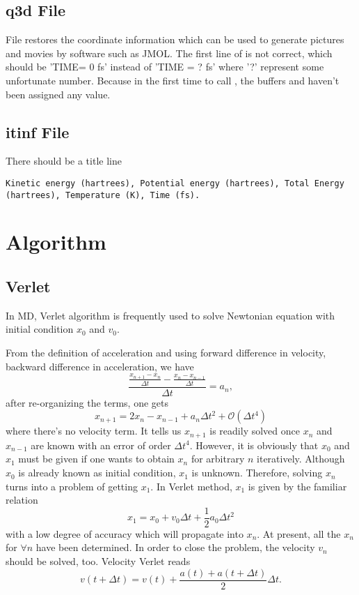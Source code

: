 \documentclass[11pt]{JHEP3}
\begin{document}
\subsection{q3d File}
File  restores the coordinate information which can be
used to generate pictures and movies by software such as JMOL. The
first line of  is not correct, which should be 'TIME= 0
fs' instead of 'TIME = ? fs' where '?' represent some unfortunate
number. Because in the first time to call ,
the buffers  and  haven't been assigned
any value.
\subsection{itinf File}
There should be a title line
\begin{lstlisting}
Kinetic energy (hartrees), Potential energy (hartrees), Total Energy
(hartrees), Temperature (K), Time (fs).
\end{lstlisting}


\section{Algorithm}
\subsection{Verlet}
In MD, Verlet algorithm is frequently used to solve Newtonian
equation with initial condition $x_0$ and $v_0$.

From the definition of acceleration and using forward difference in
velocity, backward difference in acceleration, we have
\[ \frac{\frac{x_{n+1}-x_n}{\Delta
t}-\frac{x_{n}-x_{n-1}}{\Delta t}}{\Delta t} = a_n, \] after
re-organizing the terms, one gets
\[  x_{n+1} = 2 x_n -x_{n-1} + a_n \Delta t^2 + \mathcal{O}(\Delta t^4) \]
where there's no velocity term. It tells us $x_{n+1}$ is readily
solved once $x_n$ and $x_{n-1}$ are known with an error of order
$\Delta t^4$. However, it is obviously that $x_0$ and $x_1$ must be
given if one wants to obtain $x_n$ for arbitrary $n$ iteratively.
Although $x_0$ is already known as initial condition, $x_1$ is
unknown. Therefore, solving $x_{n}$ turns into a problem of getting
$x_1$. In Verlet method, $x_1$ is given by the familiar relation
\[ x_1=x_0+v_0 \Delta t + \frac{1}{2} a_0 \Delta t^2 \] with a low
degree of accuracy which will propagate into $x_n$. At present, all
the $x_n$ for $\forall n$ have been determined. In order to close
the problem, the velocity $v_n$ should be solved, too. Velocity
Verlet reads
\[ v(t+\Delta t) = v(t) + \frac{a(t)+a(t+\Delta t)}{2}\Delta t. \]
\end{document}

